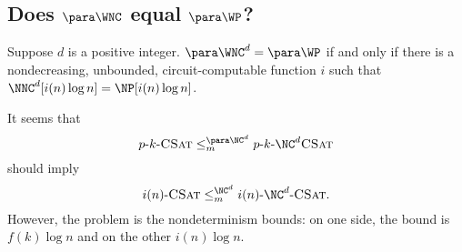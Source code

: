\subsection{Does \texorpdfstring{$\para \WNC$}{paraWNC} equal \texorpdfstring{$\para \WP$}{paraWP}?}
\label{sec:wncwp}

\begin{conjecture}
  Suppose $d$ is a positive integer.
  $\para \WNC^d = \para \WP$ if and only if there is a nondecreasing, unbounded, circuit-computable function $i$ such that $\NNC^d[i(n) \log n] = \NP[i(n) \log n]$.
\end{conjecture}
\begin{justification}
  It seems that
  \[
  \pCkSAT \leq_m^{\para \NC^d} \pNCSAT
  \]
  should imply
  \[
  \iCSAT \leq_m^{\NC^d} \iNCSAT.
  \]
  However, the problem is the nondeterminism bounds: on one side, the bound is $f(k) \log n$ and on the other $i(n) \log n$.
\end{justification}
